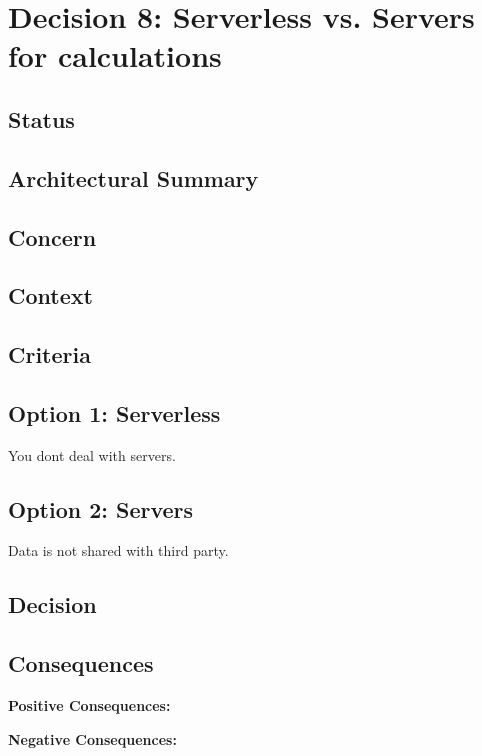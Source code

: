 \section*{Decision 8: Serverless vs. Servers for calculations}

\subsection*{Status}

\subsection*{Architectural Summary}


\subsection*{Concern}


\subsection*{Context}


\subsection*{Criteria}
\begin{itemize}
\end{itemize}

\subsection*{Option 1: Serverless}
You dont deal with servers.

\subsection*{Option 2: Servers}
Data is not shared with third party.

\subsection*{Decision}

\subsection*{Consequences}
\textbf{Positive Consequences:}
\begin{itemize}
\end{itemize}
\textbf{Negative Consequences:}
\begin{itemize}
\end{itemize}